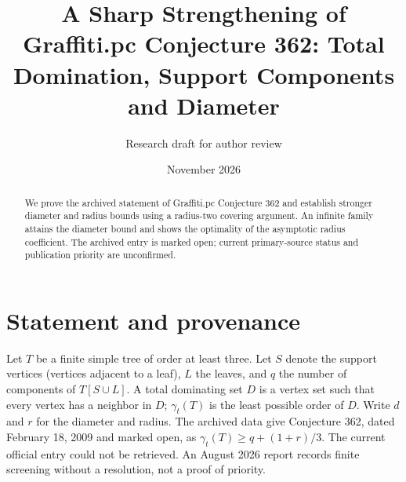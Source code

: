 \documentclass[11pt]{article}
\title{A Sharp Strengthening of Graffiti.pc Conjecture 362: Total Domination, Support Components and Diameter}
\author{Research draft for author review}
\date{November 2026}
\begin{document}
\maketitle
\begin{abstract}
We prove the archived statement of Graffiti.pc Conjecture 362 and establish stronger diameter and radius bounds using a radius-two covering argument. An infinite family attains the diameter bound and shows the optimality of the asymptotic radius coefficient. The archived entry is marked open; current primary-source status and publication priority are unconfirmed.
\end{abstract}
\section{Statement and provenance}
Let $T$ be a finite simple tree of order at least three. Let $S$ denote the support vertices (vertices adjacent to a leaf), $L$ the leaves, and $q$ the number of components of $T[S\cup L]$. A total dominating set $D$ is a vertex set such that every vertex has a neighbor in $D$; $\gamma_t(T)$ is the least possible order of $D$. Write $d$ and $r$ for the diameter and radius. The archived data \cite{archive} give Conjecture 362, dated February 18, 2009 and marked open, as $\gamma_t(T)\ge q+(1+r)/3$. The current official entry \cite{wow} could not be retrieved. An August 2026 report \cite{screen} records finite screening without a resolution, not a proof of priority.
\end{document}
